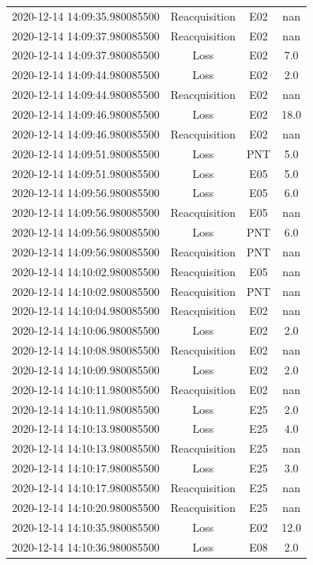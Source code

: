 \begin{enumerate}
\begin{longtabu}{cccc}
2020{-}12{-}14 14:09:35.980085500&Reacquisition&E02&nan\\%
2020{-}12{-}14 14:09:37.980085500&Reacquisition&E02&nan\\%
2020{-}12{-}14 14:09:37.980085500&Loss&E02&7.0\\%
2020{-}12{-}14 14:09:44.980085500&Loss&E02&2.0\\%
2020{-}12{-}14 14:09:44.980085500&Reacquisition&E02&nan\\%
2020{-}12{-}14 14:09:46.980085500&Loss&E02&18.0\\%
2020{-}12{-}14 14:09:46.980085500&Reacquisition&E02&nan\\%
2020{-}12{-}14 14:09:51.980085500&Loss&PNT&5.0\\%
2020{-}12{-}14 14:09:51.980085500&Loss&E05&5.0\\%
2020{-}12{-}14 14:09:56.980085500&Loss&E05&6.0\\%
2020{-}12{-}14 14:09:56.980085500&Reacquisition&E05&nan\\%
2020{-}12{-}14 14:09:56.980085500&Loss&PNT&6.0\\%
2020{-}12{-}14 14:09:56.980085500&Reacquisition&PNT&nan\\%
2020{-}12{-}14 14:10:02.980085500&Reacquisition&E05&nan\\%
2020{-}12{-}14 14:10:02.980085500&Reacquisition&PNT&nan\\%
2020{-}12{-}14 14:10:04.980085500&Reacquisition&E02&nan\\%
2020{-}12{-}14 14:10:06.980085500&Loss&E02&2.0\\%
2020{-}12{-}14 14:10:08.980085500&Reacquisition&E02&nan\\%
2020{-}12{-}14 14:10:09.980085500&Loss&E02&2.0\\%
2020{-}12{-}14 14:10:11.980085500&Reacquisition&E02&nan\\%
2020{-}12{-}14 14:10:11.980085500&Loss&E25&2.0\\%
2020{-}12{-}14 14:10:13.980085500&Loss&E25&4.0\\%
2020{-}12{-}14 14:10:13.980085500&Reacquisition&E25&nan\\%
2020{-}12{-}14 14:10:17.980085500&Loss&E25&3.0\\%
2020{-}12{-}14 14:10:17.980085500&Reacquisition&E25&nan\\%
2020{-}12{-}14 14:10:20.980085500&Reacquisition&E25&nan\\%
2020{-}12{-}14 14:10:35.980085500&Loss&E02&12.0\\%
2020{-}12{-}14 14:10:36.980085500&Loss&E08&2.0\\%

\end{longtabu}
\end{enumerate}
